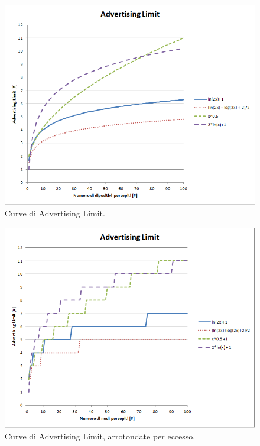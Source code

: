 \begin{figure}
	\centering
	\includegraphics[width=0.9\linewidth]{Images/grafici_usati/AL_curve_no_arr}
	\caption[AL]{Curve di Advertising Limit.}
	\label{fig:AL_curve_no_arr}
\end{figure}
\begin{figure}
\centering
\includegraphics[width=0.9\linewidth]{Images/grafici_usati/AL_curve_arr}
\caption[AL arrotondato]{Curve di Advertising Limit, arrotondate per eccesso.}
\label{fig:AL_curve_arr}
\end{figure}
